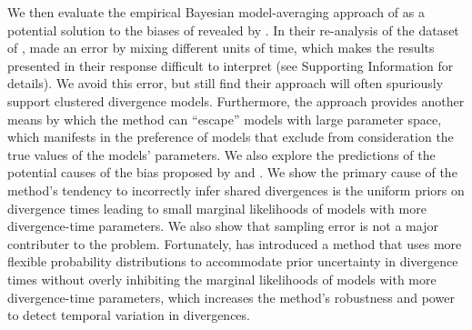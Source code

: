 We then evaluate the empirical Bayesian model-averaging approach of
\citet{Hickerson2013} as a potential solution to the biases of \msb revealed by
\citet{Oaks2012}.
In their re-analysis of the dataset of \citet{Oaks2012}, \citet{Hickerson2013}
made an error by mixing different units of time, which makes the results
presented in their response difficult to interpret (see Supporting Information
for details).
We avoid this error, but still find their approach will often spuriously
support clustered divergence models.
Furthermore, the approach provides another means by which the method can
``escape'' models with large parameter space, which manifests in the preference
of models that exclude from consideration the true values of the models'
parameters.
We also explore the predictions of the potential causes of the bias proposed by
\citet{Oaks2012} and \citet{Hickerson2013}.
We show the primary cause of the method's tendency to incorrectly infer shared
divergences is the uniform priors on divergence times leading to small marginal
likelihoods of models with more divergence-time parameters.
We also show that sampling error is not a major contributer to the problem.
Fortunately, \citet{Oaks2014dpp} has introduced a method that uses more
flexible probability distributions to accommodate prior uncertainty in
divergence times without overly inhibiting the marginal likelihoods of models
with more divergence-time parameters, which increases the method's robustness
and power to detect temporal variation in divergences.



